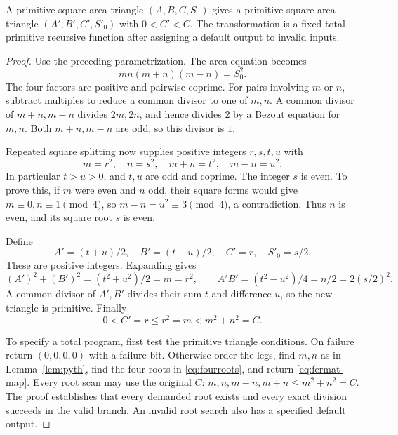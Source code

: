 \begin{lemma}\label{lem:fermat-step}
A primitive square-area triangle $(A,B,C,S_0)$ gives a primitive
square-area triangle $(A',B',C',S'_0)$ with $0<C'<C$.
The transformation is a fixed total primitive recursive function after
assigning a default output to invalid inputs.
\end{lemma}
\begin{proof}
Use the preceding parametrization. The area equation becomes
\[
             mn(m+n)(m-n)=S_0^2.
 \tag{6.3}\label{eq:fourfactors}
\]
The four factors are positive and pairwise coprime.
For pairs involving $m$ or $n$, subtract multiples to reduce a common
divisor to one of $m,n$. A common divisor of $m+n,m-n$ divides
$2m,2n$, and hence divides $2$ by a Bezout equation for $m,n$.
Both $m+n,m-n$ are odd, so this divisor is $1$.

Repeated square splitting now supplies positive integers $r,s,t,u$ with
\[
        m=r^2,\quad n=s^2,\quad m+n=t^2,\quad m-n=u^2.
 \tag{6.4}\label{eq:fourroots}
\]
In particular $t>u>0$, and $t,u$ are odd and coprime.
The integer $s$ is even. To prove this, if $m$ were even and $n$ odd,
their square forms would give $m\equiv0,n\equiv1\pmod4$,
so $m-n=u^2\equiv3\pmod4$, a contradiction.
Thus $n$ is even, and its square root $s$ is even.

Define
\[
        A'=(t+u)/2,\quad B'=(t-u)/2,\quad C'=r,\quad S'_0=s/2.
 \tag{6.5}\label{eq:fermat-map}
\]
These are positive integers. Expanding gives
\[
 (A')^2+(B')^2=(t^2+u^2)/2=m=r^2,
 \qquad
 A'B'=(t^2-u^2)/4=n/2=2(s/2)^2.
 \tag{6.6}
\]
A common divisor of $A',B'$ divides their sum $t$ and difference $u$,
so the new triangle is primitive. Finally
\[
                 0<C'=r\le r^2=m<m^2+n^2=C.
 \tag{6.7}
\]

To specify a total program, first test the primitive triangle conditions.
On failure return $(0,0,0,0)$ with a failure bit. Otherwise order the legs,
find $m,n$ as in Lemma~\ref{lem:pyth}, find the four roots in
\eqref{eq:fourroots}, and return \eqref{eq:fermat-map}.
Every root scan may use the original $C$:
$m,n,m-n,m+n\le m^2+n^2=C$.
The proof establishes that every demanded root exists and every exact
division succeeds in the valid branch. An invalid root search also has a
specified default output.
\end{proof}


